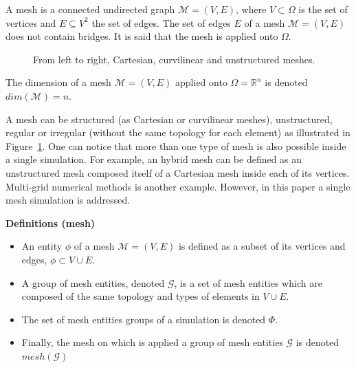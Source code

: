 \begin{mydef}
A mesh is a connected undirected graph $\mathcal{M}=(V,E)$, where $V\subset \Omega$ is the set of vertices and $E\subseteq V^2$ the set of edges. The set of edges $E$ of a mesh $\mathcal{M}=(V,E)$ does not contain bridges. It is said that the mesh is applied onto $\Omega$.
\end{mydef}
\begin{figure}[!h]\begin{center}
  \caption{From left to right, Cartesian, curvilinear and unstructured meshes.}
  \label{fig:mesh1}
\end{center}\end{figure}
\begin{mydef}
The dimension of a mesh $\mathcal{M}=(V,E)$ applied onto $\Omega=\mathbb{R}^n$ is denoted $dim(\mathcal{M})=n$.
\end{mydef}
A mesh can be structured (as Cartesian or curvilinear meshes), unstructured, regular or irregular (without the same topology for each element) as illustrated in Figure~\ref{fig:mesh1}. One can notice that more than one type of mesh is also possible inside a single simulation. For example, an hybrid mesh can be defined as an unstructured mesh composed itself of a Cartesian mesh inside each of its vertices. Multi-grid numerical methods is another example. However, in this paper a single mesh simulation is addressed.

\medskip
\noindent \textbf{Definitions (mesh)}
\begin{itemize}
\item An entity $\phi$ of a mesh $\mathcal{M}=(V,E)$ is defined as a subset of its vertices and edges, $\phi\subset V\cup E$.
\item A group of mesh entities, denoted $\mathcal{G}$, is a set of mesh entities which are composed of the same topology and types of elements in $V\cup E$.
\item The set of mesh entities groups of a simulation is denoted $\Phi$.
\item Finally, the mesh on which is applied a group of mesh entities $\mathcal{G}$ is denoted $mesh(\mathcal{G})$
\end{itemize}

